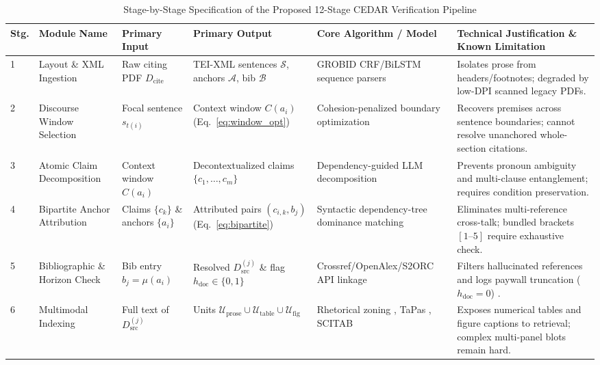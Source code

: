 \documentclass[journal]{IEEEtran}
\begin{document}
\begin{table}[t]
\centering
\footnotesize
\caption{Stage-by-Stage Specification of the Proposed 12-Stage CEDAR Verification Pipeline}
\label{tab:pipeline_stages}
\renewcommand{\arraystretch}{1.13}
\begin{tabularx}{\textwidth}{C{0.5cm} L{2.5cm} L{2.3cm} L{2.4cm} L{3.2cm} Y}
\toprule
\textbf{Stg.} & \textbf{Module Name} & \textbf{Primary Input} & \textbf{Primary Output} & \textbf{Core Algorithm / Model} & \textbf{Technical Justification \& Known Limitation} \\
 & Layout \& XML Ingestion & Raw citing PDF $D_{\text{cite}}$ & TEI-XML sentences $\mathcal{S}$, anchors $\mathcal{A}$, bib $\mathcal{B}$ & GROBID \cite{lopez2009grobid} CRF/BiLSTM sequence parsers & Isolates prose from headers/footnotes; degraded by low-DPI scanned legacy PDFs. \\
2 & Discourse Window Selection & Focal sentence $s_{t(i)}$ & Context window $C(a_i)$ (Eq.~\ref{eq:window_opt}) & Cohesion-penalized boundary optimization \cite{jurgens2018measuring} & Recovers premises across sentence boundaries; cannot resolve unanchored whole-section citations. \\
3 & Atomic Claim Decomposition & Context window $C(a_i)$ & Decontextualized claims $\{c_1, \dots, c_m\}$ & Dependency-guided LLM decomposition \cite{kamoi2023wice,min2023factscore} & Prevents pronoun ambiguity and multi-clause entanglement; requires condition preservation. \\
4 & Bipartite Anchor Attribution & Claims $\{c_k\}$ \& anchors $\{a_i\}$ & Attributed pairs $(c_{i,k}, b_j)$ (Eq.~\ref{eq:bipartite}) & Syntactic dependency-tree dominance matching & Eliminates multi-reference cross-talk; bundled brackets $[1\text{--}5]$ require exhaustive check. \\
5 & Bibliographic \& Horizon Check & Bib entry $b_j = \mu(a_i)$ & Resolved $D_{\text{src}}^{(j)}$ \& flag $h_{\text{doc}} \in \{0,1\}$ & Crossref/OpenAlex/S2ORC API linkage \cite{lo2020s2orc} & Filters hallucinated references and logs paywall truncation ($h_{\text{doc}}=0$) \cite{lariviere2015oligopoly}. \\
6 & Multimodal Indexing & Full text of $D_{\text{src}}^{(j)}$ & Units $\mathcal{U}_{\text{prose}} \cup \mathcal{U}_{\text{table}} \cup \mathcal{U}_{\text{fig}}$ & Rhetorical zoning \cite{teufel2006automatic}, TaPas \cite{herzig2020tapas}, SCITAB \cite{lu2023scitab} & Exposes numerical tables and figure captions to retrieval; complex multi-panel blots remain hard. \\

\end{tabularx}
\end{table}
\end{document}
